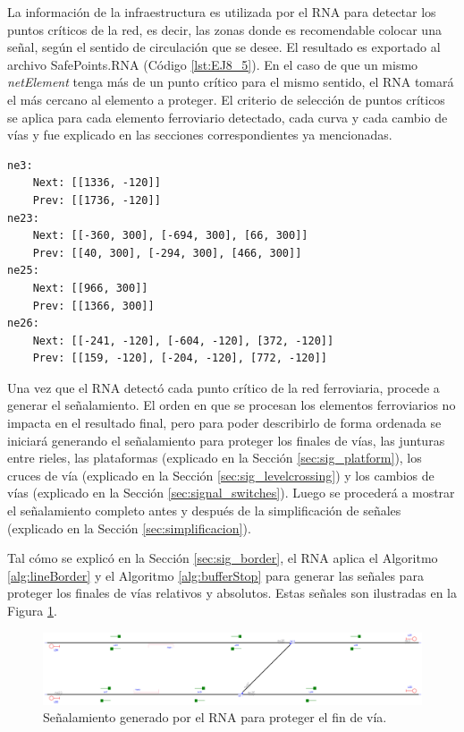 	La información de la infraestructura es utilizada por el RNA para detectar los puntos críticos de la red, es decir, las zonas donde es recomendable colocar una señal, según el sentido de circulación que se desee. El resultado es exportado al archivo SafePoints.RNA (Código \ref{lst:EJ8_5}). En el caso de que un mismo \textit{netElement} tenga más de un punto crítico para el mismo sentido, el RNA tomará el más cercano al elemento a proteger. El criterio de selección de puntos críticos se aplica para cada elemento ferroviario detectado, cada curva y cada cambio de vías y fue explicado en las secciones correspondientes ya mencionadas.
	
	\begin{lstlisting}[language = {}, caption = SafePoints.RNA, label = {lst:EJ8_5}]
ne3:
	Next: [[1336, -120]]
	Prev: [[1736, -120]]
ne23:
	Next: [[-360, 300], [-694, 300], [66, 300]]
	Prev: [[40, 300], [-294, 300], [466, 300]]
ne25:
	Next: [[966, 300]]
	Prev: [[1366, 300]]
ne26:
	Next: [[-241, -120], [-604, -120], [372, -120]]
	Prev: [[159, -120], [-204, -120], [772, -120]]
	\end{lstlisting}	
	
	Una vez que el RNA detectó cada punto crítico de la red ferroviaria, procede a generar el señalamiento. El orden en que se procesan los elementos ferroviarios no impacta en el resultado final, pero para poder describirlo de forma ordenada se iniciará generando el señalamiento para proteger los finales de vías, las junturas entre rieles, las plataformas (explicado en la Sección \ref{sec:sig_platform}), los cruces de vía (explicado en la Sección \ref{sec:sig_levelcrossing}) y los cambios de vías (explicado en la Sección \ref{sec:signal_switches}). Luego se procederá a mostrar el señalamiento completo antes y después de la simplificación de señales (explicado en la Sección \ref{sec:simplificacion}). 
	
	Tal cómo se explicó en la Sección \ref{sec:sig_border}, el RNA aplica el Algoritmo \ref{alg:lineBorder} y el Algoritmo \ref{alg:bufferStop} para generar las señales para proteger los finales de vías relativos y absolutos. Estas señales son ilustradas en la Figura \ref{fig:EJ8_3}.
	
	\begin{figure}[H]
		\centering
		\includegraphics[width=1\textwidth]{resultados-obtenidos/ejemplo8/images/8_step1.png}
		\centering\caption{Señalamiento generado por el RNA para proteger el fin de vía.}
		\label{fig:EJ8_3}
	\end{figure}
	
